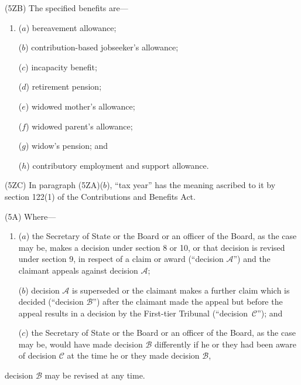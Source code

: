 \documentclass[12pt,a4paper]{article}
\begin{document}
(5ZB) The specified benefits are—
\begin{enumerate}\item[]
($a$) bereavement allowance;

($b$) contribution-based jobseeker’s allowance;

($c$) incapacity benefit;

($d$) retirement pension;

($e$) widowed mother’s allowance;

($f$) widowed parent’s allowance; 

($g$) widow’s pension;
% 
and

($h$) contributory employment and support allowance.
\end{enumerate}

(5ZC) In paragraph (5ZA)($b$), “tax year” has the meaning ascribed to it by section 122(1) of the Contributions and Benefits Act.

(5A) Where—
\begin{enumerate}\item[]
($a$) the Secretary of State or the Board or an officer of the Board, as the case may be, makes a decision under section 8 or 10, or that decision is revised under section 9, in respect of a claim or award (“decision $\mathcal{A}$”) and the claimant appeals against decision $\mathcal{A}$;

($b$) decision $\mathcal{A}$ is superseded or the claimant makes a further claim which is decided (“decision $\mathcal{B}$”) after the claimant made the appeal but before the appeal results in a decision by 
the First-tier Tribunal  %
(“decision~$\mathcal{C}$”); and

($c$) the Secretary of State or the Board or an officer of the Board, as the case may be, would have made decision $\mathcal{B}$ differently if he or they had been aware of decision $\mathcal{C}$ at the time he or they made decision $\mathcal{B}$,
\end{enumerate}
decision $\mathcal{B}$ may be revised at any time.
\end{document}

